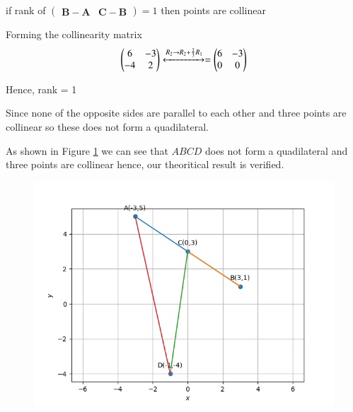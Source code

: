 \documentclass[12pt]{article}
\newcommand{\myvec}[1]{\ensuremath{\begin{pmatrix}#1\end{pmatrix}}}
\let\vec\mathbf
\begin{document}
\begin{enumerate}
\begin{enumerate}
	if rank of $\myvec{\vec{B}-\vec{A} & \vec{C}-\vec{B}} = 1$ then points are collinear

	Forming the collinearity matrix
	\begin{align}
		\myvec{6&-3\\-4&2} \xleftrightarrow{R_{2}\rightarrow R_{2}+\frac{2}{3}R_{1}}= \myvec{6&-3\\0&0}
	\end{align}
	\end{enumerate}
	Hence, rank = 1

	Since none of the opposite sides are parallel to each other and three points are collinear so these does not form a quadilateral.

	As shown in Figure \ref{fig:10/7/1/6/Fig2} we can see that $ABCD$ does not form a quadilateral and three points are collinear hence, our theoritical result is verified.
	
\begin{figure}[!h]
	\begin{center} 
	    \includegraphics[width=\columnwidth]{chapters/10/7/1/6/figs/quad2}
	\end{center}
\caption{}
\label{fig:10/7/1/6/Fig2}
\end{figure}
	

\end{enumerate}
\end{document}

